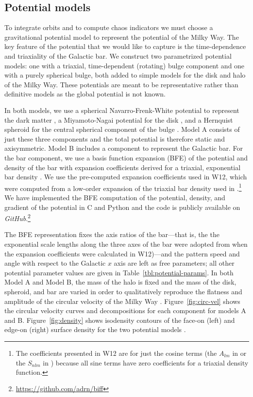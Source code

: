 \documentclass[letterpaper,12pt,preprint]{aastex}
\newcommand{\project}[1]{\textsl{#1}}
\begin{document}
\subsection{Potential models}\label{sec:potential}

To integrate orbits and to compute chaos indicators we must choose a gravitational potential model to represent the potential of the Milky Way. The key feature of the potential that we would like to capture is the time-dependence and triaxiality of the Galactic bar. We construct two parametrized potential models: one with a triaxial, time-dependent (rotating) bulge component and one with a purely spherical bulge, both added to simple models for the disk and halo of the Milky Way. These potentials are meant to be representative rather than definitive models as the global potential is not known.

In both models, we use a spherical Navarro-Frenk-White potential to represent the dark matter \citep{nfw96}, a Miyamoto-Nagai potential for the disk \citep{miyamoto75}, and a Hernquist spheroid for the central spherical component of the bulge \citep{hernquist90}. Model A consists of just these three components and the total potential is therefore static and axisymmetric. Model B includes a component to represent the Galactic bar. For the bar component, we use a basis function expansion (BFE) of the potential and density of the bar with expansion coefficients derived for a triaxial, exponential bar density \citep[][hereafter W12]{wang12}. We use the pre-computed expansion coefficients used in W12, which were computed from a low-order expansion of the triaxial bar density used in \citet{dwek95}.\footnote{The coefficients presented in W12 are for just the cosine terms (the $A_{lm}$ in \citet{hernquist92} or the $S_{nlm}$ in \citet{lowing11}) because all sine terms have zero coefficients for a triaxial density function.} We have implemented the BFE computation of the potential, density, and gradient of the potential in C and Python and the code is publicly available on \project{GitHub}.\footnote{\url{https://github.com/adrn/biff}} 

The BFE representation fixes the axis ratios of the bar---that is, the the exponential scale lengths along the three axes of the bar were adopted from \cite{dwek95} when the expansion coefficients were calculated in W12)---and the pattern speed and angle with respect to the Galactic $x$ axis are left as free parameters; all other potential parameter values are given in Table~\ref{tbl:potential-params}. In both Model A and Model B, the mass of the halo is fixed and the mass of the disk, spheroid, and bar are varied in order to qualitatively reproduce the flatness and amplitude of the circular velocity of the Milky Way \citep{bovy12}. Figure~\ref{fig:circ-vel} shows the circular velocity curves and decompositions for each component for models A and B. Figure~\ref{fig:density} shows isodensity contours of the face-on (left) and edge-on (right) surface density for the two potential models \citep[compare to, e.g., Figure 3 in][]{portail15}. 
\end{document}
